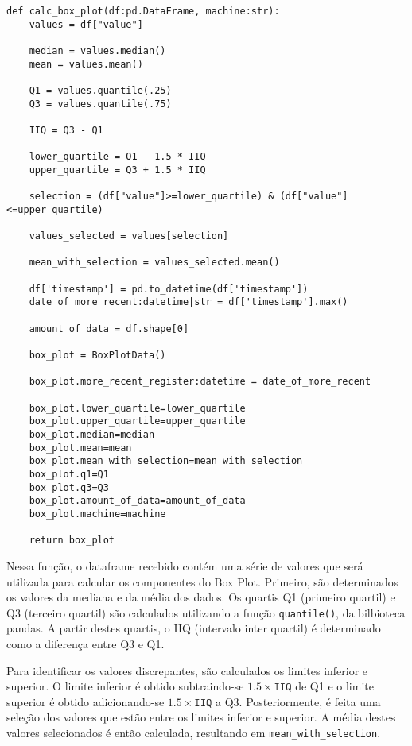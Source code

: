 \begin{verbatim}
def calc_box_plot(df:pd.DataFrame, machine:str):
    values = df["value"]

    median = values.median()
    mean = values.mean()

    Q1 = values.quantile(.25)
    Q3 = values.quantile(.75)

    IIQ = Q3 - Q1

    lower_quartile = Q1 - 1.5 * IIQ
    upper_quartile = Q3 + 1.5 * IIQ
    
    selection = (df["value"]>=lower_quartile) & (df["value"]<=upper_quartile)

    values_selected = values[selection]
    
    mean_with_selection = values_selected.mean()

    df['timestamp'] = pd.to_datetime(df['timestamp'])
    date_of_more_recent:datetime|str = df['timestamp'].max()

    amount_of_data = df.shape[0]

    box_plot = BoxPlotData()

    box_plot.more_recent_register:datetime = date_of_more_recent

    box_plot.lower_quartile=lower_quartile
    box_plot.upper_quartile=upper_quartile
    box_plot.median=median
    box_plot.mean=mean
    box_plot.mean_with_selection=mean_with_selection
    box_plot.q1=Q1
    box_plot.q3=Q3
    box_plot.amount_of_data=amount_of_data
    box_plot.machine=machine

    return box_plot
\end{verbatim}


Nessa função, o dataframe recebido contém uma série de valores que será utilizada para calcular os componentes do Box Plot. Primeiro, são determinados os valores da mediana e da média dos dados. Os quartis Q1 (primeiro quartil) e Q3 (terceiro quartil) são calculados utilizando a função \texttt{quantile()}, da bilbioteca pandas. A partir destes quartis, o IIQ (intervalo inter quartil) é determinado como a diferença entre Q3 e Q1.

Para identificar os valores discrepantes, são calculados os limites inferior e superior. O limite inferior é obtido subtraindo-se \(1.5 \times \texttt{IIQ}\) de Q1 e o limite superior é obtido adicionando-se \(1.5 \times \texttt{IIQ}\) a Q3. Posteriormente, é feita uma seleção dos valores que estão entre os limites inferior e superior. A média destes valores selecionados é então calculada, resultando em \texttt{mean\_with\_selection}.

